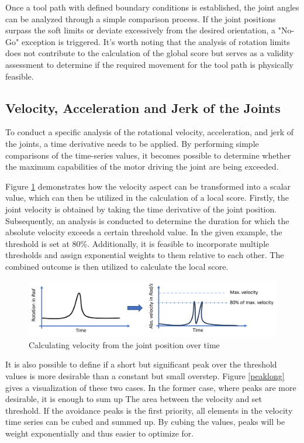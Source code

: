 Once a tool path with defined boundary conditions is established, the joint angles can be analyzed through a simple comparison process. If the joint positions surpass the soft limits or deviate excessively from the desired orientation, a "No-Go" exception is triggered. It's worth noting that the analysis of rotation limits does not contribute to the calculation of the global score but serves as a validity assessment to determine if the required movement for the tool path is physically feasible.
\newpage
\subsection{Velocity, Acceleration and Jerk of the Joints}\label{VAJJ}
To conduct a specific analysis of the rotational velocity, acceleration, and jerk of the joints, a time derivative needs to be applied. By performing simple comparisons of the time-series values, it becomes possible to determine whether the maximum capabilities of the motor driving the joint are being exceeded.

Figure \ref{velo} demonstrates how the velocity aspect can be transformed into a scalar value, which can then be utilized in the calculation of a local score. Firstly, the joint velocity is obtained by taking the time derivative of the joint position. Subsequently, an analysis is conducted to determine the duration for which the absolute velocity exceeds a certain threshold value. In the given example, the threshold is set at 80\%. Additionally, it is feasible to incorporate multiple thresholds and assign exponential weights to them relative to each other. The combined outcome is then utilized to calculate the local score.

\begin{figure}[H]
	\centerline{\includegraphics[width=1\textwidth]{figures/veloy.png}}
	\caption{Calculating velocity from the joint position over time}
	\label{velo}
\end{figure}

It is also possible to define if a short but significant peak over the threshold values is more desirable than a constant but small overstep. Figure \ref{peaklong} gives a visualization of these two cases. In the former case, where peaks are more desirable, it is enough to sum up The area between the velocity and set threshold. If the avoidance peaks is the first priority, all elements in the velocity time series can be cubed and summed up. By cubing the values, peaks will be weight exponentially and thus easier to optimize for.

